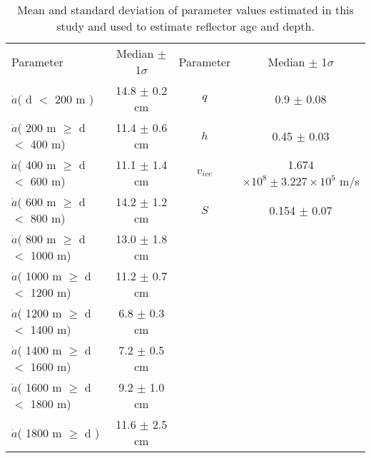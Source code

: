  \begin{table}
 \centering
 \caption{ Mean and standard deviation of parameter values estimated in this study and used to estimate reflector age and depth. }
 \begin{tabular}{ l c | c c }
Parameter & Median $\pm$ 1$\sigma$ & Parameter & Median $\pm$ 1$\sigma$  \\   
 \cline{1-4}
  $\dot{a}$( d $<$ 200 m )                         & 14.8 $\pm$ 0.2 cm & $q$            &  0.9      $\pm$ 0.08  \\
  $\dot{a}$( 200 m  $\ge$ d $<$ 400 m)    & 11.4 $\pm$ 0.6 cm & $h$            &  0.45     $\pm$ 0.03  \\
  $\dot{a}$( 400 m  $\ge$ d $<$ 600 m)    & 11.1 $\pm$ 1.4 cm & $v_{ice}$   & 1.674  $\times 10^8 \pm 3.227 \times 10^5$ m/s     \\
  $\dot{a}$( 600 m  $\ge$ d $<$ 800 m)    & 14.2 $\pm$ 1.2 cm & $S$            & 0.154    $\pm$ 0.07  \\
  $\dot{a}$( 800 m  $\ge$ d $<$ 1000 m)  & 13.0 $\pm$ 1.8 cm & \\ 
  $\dot{a}$( 1000 m $\ge$ d $<$ 1200 m) & 11.2 $\pm$ 0.7 cm & \\
  $\dot{a}$( 1200 m $\ge$ d $<$ 1400 m) &   6.8 $\pm$ 0.3 cm & \\
  $\dot{a}$( 1400 m $\ge$ d $<$ 1600 m) &   7.2 $\pm$ 0.5 cm & \\
  $\dot{a}$( 1600 m $\ge$ d $<$ 1800 m) &   9.2 $\pm$ 1.0 cm & \\
  $\dot{a}$( 1800 m $\ge$ d )                    & 11.6 $\pm$ 2.5 cm & \\%
 \end{tabular}

 \label{tab:paramvals}
\end{table}

